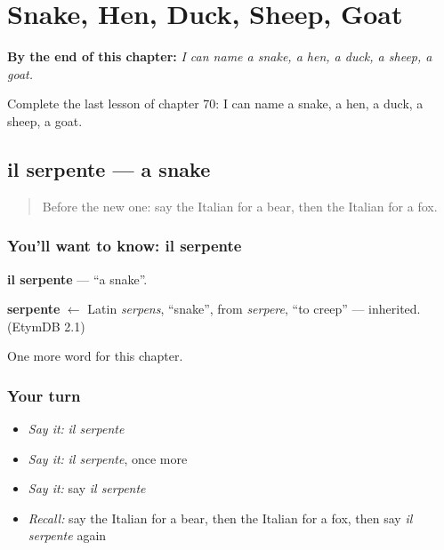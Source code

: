 
\chapter{Snake, Hen, Duck, Sheep, Goat}
\label{ch:it-snake-hen-duck-sheep-goat}

\begin{chapteropening}
\textbf{By the end of this chapter:} \emph{I can name a snake, a hen, a duck, a sheep, a goat.}

Complete the last lesson of chapter 70: I can name a snake, a hen, a duck, a sheep, a goat.
\end{chapteropening}

\section[il serpente]{il serpente — a snake}

\label{lesson:IT-C70-serpente}



\begin{quote}
Before the new one: say the Italian for a bear, then the Italian for a fox.
\end{quote}

\subsection*{You'll want to know: il serpente}
\textbf{il serpente} — \textquotedblleft{}a snake\textquotedblright{}.

\begin{cousinweb}
\textbf{serpente} $\leftarrow$ Latin \emph{serpens}, \textquotedblleft{}snake\textquotedblright{}, from \emph{serpere}, \textquotedblleft{}to creep\textquotedblright{} — inherited. (EtymDB 2.1)
\end{cousinweb}

\begin{grammarlens}[title={What you've built}]
One more word for this chapter.
\end{grammarlens}

\subsection*{Your turn}
\begin{itemize}
\raggedright
  \item \emph{Say it:} \emph{il serpente}
  \item \emph{Say it:} \emph{il serpente}, once more
  \item \emph{Say it:} say \emph{il serpente}
  \item \emph{Recall:} say the Italian for a bear, then the Italian for a fox, then say \emph{il serpente} again
\end{itemize}

